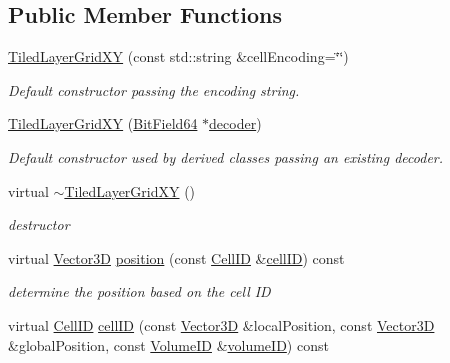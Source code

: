 \subsection*{Public Member Functions}
\begin{DoxyCompactItemize}
\item 
\hyperlink{class_d_d4hep_1_1_d_d_segmentation_1_1_tiled_layer_grid_x_y_acbf674bb93ded0eedfa0d57426af8400}{Tiled\+Layer\+Grid\+XY} (const std\+::string \&cell\+Encoding=\char`\"{}\char`\"{})
\begin{DoxyCompactList}\small\item\em Default constructor passing the encoding string. \end{DoxyCompactList}\item 
\hyperlink{class_d_d4hep_1_1_d_d_segmentation_1_1_tiled_layer_grid_x_y_a4ff90dbb3f490c1258513bfb3c26e215}{Tiled\+Layer\+Grid\+XY} (\hyperlink{class_d_d4hep_1_1_d_d_segmentation_1_1_bit_field64}{Bit\+Field64} $\ast$\hyperlink{class_d_d4hep_1_1_d_d_segmentation_1_1_segmentation_abec3489982d0fe91ef4b142d9d755576}{decoder})
\begin{DoxyCompactList}\small\item\em Default constructor used by derived classes passing an existing decoder. \end{DoxyCompactList}\item 
virtual \hyperlink{class_d_d4hep_1_1_d_d_segmentation_1_1_tiled_layer_grid_x_y_a03eeb88ffc324d56f3bfac3abb707e62}{$\sim$\+Tiled\+Layer\+Grid\+XY} ()
\begin{DoxyCompactList}\small\item\em destructor \end{DoxyCompactList}\item 
virtual \hyperlink{struct_d_d4hep_1_1_d_d_segmentation_1_1_vector3_d}{Vector3D} \hyperlink{class_d_d4hep_1_1_d_d_segmentation_1_1_tiled_layer_grid_x_y_af1018adc15e286afdc0abfa69a78f462}{position} (const \hyperlink{namespace_d_d4hep_1_1_d_d_segmentation_ac7af071d85cb48820914434a07e21ba1}{Cell\+ID} \&\hyperlink{class_d_d4hep_1_1_d_d_segmentation_1_1_tiled_layer_grid_x_y_a4fa76f53ffa685139ce759e3bb9ea1ea}{cell\+ID}) const
\begin{DoxyCompactList}\small\item\em determine the position based on the cell ID \end{DoxyCompactList}\item 
virtual \hyperlink{namespace_d_d4hep_1_1_d_d_segmentation_ac7af071d85cb48820914434a07e21ba1}{Cell\+ID} \hyperlink{class_d_d4hep_1_1_d_d_segmentation_1_1_tiled_layer_grid_x_y_a4fa76f53ffa685139ce759e3bb9ea1ea}{cell\+ID} (const \hyperlink{struct_d_d4hep_1_1_d_d_segmentation_1_1_vector3_d}{Vector3D} \&local\+Position, const \hyperlink{struct_d_d4hep_1_1_d_d_segmentation_1_1_vector3_d}{Vector3D} \&global\+Position, const \hyperlink{namespace_d_d4hep_1_1_d_d_segmentation_a61a6833a18d1800bdef176595f83e3ba}{Volume\+ID} \&\hyperlink{class_d_d4hep_1_1_d_d_segmentation_1_1_segmentation_a43c0e9648e3b7cded015847c0802f757}{volume\+ID}) const

\end{DoxyCompactItemize}
